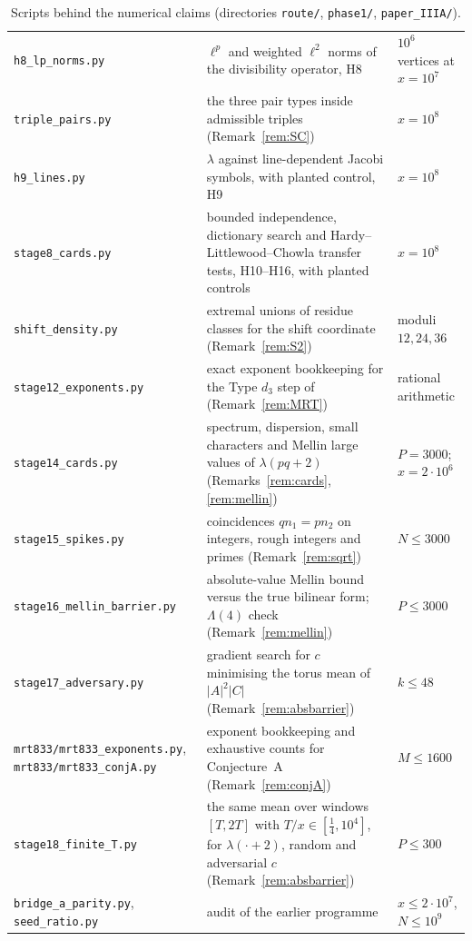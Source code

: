 \begin{table}[h]
\begin{tabular}{p{3.6cm}p{5.6cm}p{3.4cm}}
\texttt{h8\_lp\_norms.py} & $\ell^p$ and weighted $\ell^2$ norms of the divisibility operator, H8 & $10^6$ vertices at $x=10^7$\\
\texttt{triple\_pairs.py} & the three pair types inside admissible triples (Remark~\ref{rem:SC}) & $x=10^8$\\
\texttt{h9\_lines.py} & $\lambda$ against line-dependent Jacobi symbols, with planted control, H9 & $x=10^8$\\
\texttt{stage8\_cards.py} & bounded independence, dictionary search and Hardy--Littlewood--Chowla transfer tests, H10--H16, with planted controls & $x=10^8$\\
\texttt{shift\_density.py} & extremal unions of residue classes for the shift coordinate (Remark~\ref{rem:S2}) & moduli $12,24,36$\\
\texttt{stage12\_exponents.py} & exact exponent bookkeeping for the Type $d_3$ step of \cite{MRT19} (Remark~\ref{rem:MRT}) & rational arithmetic\\
\texttt{stage14\_cards.py} & spectrum, dispersion, small characters and Mellin large values of $\lambda(pq+2)$ (Remarks~\ref{rem:cards}, \ref{rem:mellin}) & $P=3000$; $x=2\cdot10^6$\\
\texttt{stage15\_spikes.py} & coincidences $qn_1=pn_2$ on integers, rough integers and primes (Remark~\ref{rem:sqrt}) & $N\le3000$\\
\texttt{stage16\_mellin\_barrier.py} & absolute-value Mellin bound versus the true bilinear form; $\Lambda(4)$ check (Remark~\ref{rem:mellin}) & $P\le3000$\\
\texttt{stage17\_adversary.py} & gradient search for $c$ minimising the torus mean of $|A|^2|C|$ (Remark~\ref{rem:absbarrier}) & $k\le48$\\
\texttt{mrt833/mrt833\_exponents.py}, \texttt{mrt833/mrt833\_conjA.py} & exponent bookkeeping and exhaustive counts for Conjecture~A (Remark~\ref{rem:conjA}) & $M\le1600$\\
\texttt{stage18\_finite\_T.py} & the same mean over windows $[T,2T]$ with $T/x\in[\frac14,10^4]$, for $\lambda(\cdot+2)$, random and adversarial $c$ (Remark~\ref{rem:absbarrier}) & $P\le300$\\
\texttt{bridge\_a\_parity.py}, \texttt{seed\_ratio.py} & audit of the earlier programme & $x\le2\cdot10^7$, $N\le10^9$\\
\bottomrule
\end{tabular}
\caption{Scripts behind the numerical claims (directories \texttt{route/}, \texttt{phase1/}, \texttt{paper\_IIIA/}).}
\label{tab:scripts}
\end{table}


